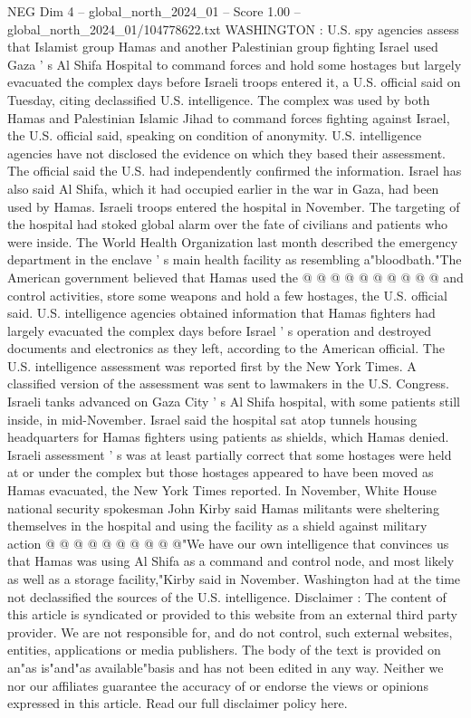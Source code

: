 \begin{textsample}{NEG Dim 4 – global\_north\_2024\_01 – Score 1.00 – global\_north\_2024\_01/104778622.txt}  \label{ex:f4_neg_129}
WASHINGTON : U.S. spy agencies assess that Islamist group Hamas and another Palestinian group fighting Israel used Gaza ' s Al Shifa Hospital to command forces and hold some hostages but largely evacuated the complex days before Israeli troops entered it, a U.S. official said on Tuesday, citing declassified U.S. intelligence.
The complex was used by both Hamas and Palestinian Islamic Jihad to command forces fighting against Israel, the U.S. official said, speaking on condition of anonymity.
U.S. intelligence agencies have not disclosed the evidence on which they based their assessment.
The official said the U.S. had independently confirmed the information.
Israel has also said Al Shifa, which it had occupied earlier in the war in Gaza, had been used by Hamas.
Israeli troops entered the hospital in November.
The targeting of the hospital had stoked global alarm over the fate of civilians and patients who were inside.
The World Health Organization last month described the emergency department in the enclave ' s main health facility as resembling a"bloodbath."The American government believed that Hamas used the @ @ @ @ @ @ @ @ @ @ and control activities, store some weapons and hold a few hostages, the U.S. official said.
U.S. intelligence agencies obtained information that Hamas fighters had largely evacuated the complex days before Israel ' s operation and destroyed documents and electronics as they left, according to the American official.
The U.S. intelligence assessment was reported first by the New York Times.
A classified version of the assessment was sent to lawmakers in the U.S.
Congress.
Israeli tanks advanced on Gaza City ' s Al Shifa hospital, with some patients still inside, in mid-November.
Israel said the hospital sat atop tunnels housing headquarters for Hamas fighters using patients as shields, which Hamas denied.
Israeli assessment ' s was at least partially correct that some hostages were held at or under the complex but those hostages appeared to have been moved as Hamas evacuated, the New York Times reported.
In November, White House national security spokesman John Kirby said Hamas militants were sheltering themselves in the hospital and using the facility as a shield against military action @ @ @ @ @ @ @ @ @ @"We have our own intelligence that convinces us that Hamas was using Al Shifa as a command and control node, and most likely as well as a storage facility,"Kirby said in November.
Washington had at the time not declassified the sources of the U.S. intelligence.
Disclaimer : The content of this article is syndicated or provided to this website from an external third party provider.
We are not responsible for, and do not control, such external websites, entities, applications or media publishers.
The body of the text is provided on an"as is"and"as available"basis and has not been edited in any way.
Neither we nor our affiliates guarantee the accuracy of or endorse the views or opinions expressed in this article.
Read our full disclaimer policy here.

\end{textsample}
